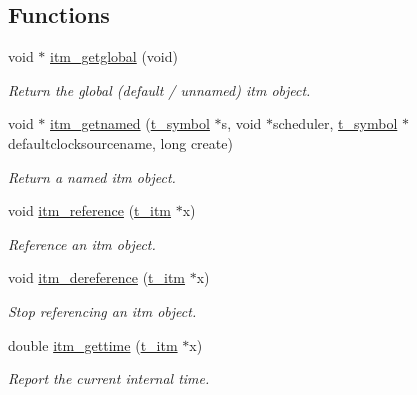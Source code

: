 \subsection*{Functions}
\begin{DoxyCompactItemize}
\item 
void $\ast$ \hyperlink{group__time_ga182b0bd45ff72d9ddccebd8cc9d552d1}{itm\_\-getglobal} (void)
\begin{DoxyCompactList}\small\item\em Return the global (default / unnamed) itm object. \item\end{DoxyCompactList}\item 
void $\ast$ \hyperlink{group__time_ga04a193f71ceaf7ce604e976a3affc99b}{itm\_\-getnamed} (\hyperlink{structt__symbol}{t\_\-symbol} $\ast$s, void $\ast$scheduler, \hyperlink{structt__symbol}{t\_\-symbol} $\ast$defaultclocksourcename, long create)
\begin{DoxyCompactList}\small\item\em Return a named itm object. \item\end{DoxyCompactList}\item 
void \hyperlink{group__time_ga33f7a4627e3d2a77748b66d2af7a0a1a}{itm\_\-reference} (\hyperlink{group__time_gac656fa1f920c69cf77e6631bcec53077}{t\_\-itm} $\ast$x)
\begin{DoxyCompactList}\small\item\em Reference an itm object. \item\end{DoxyCompactList}\item 
void \hyperlink{group__time_gae6d838ad8a0834e650a7664a50b0b6e2}{itm\_\-dereference} (\hyperlink{group__time_gac656fa1f920c69cf77e6631bcec53077}{t\_\-itm} $\ast$x)
\begin{DoxyCompactList}\small\item\em Stop referencing an itm object. \item\end{DoxyCompactList}\item 
double \hyperlink{group__time_ga6be6d66ebf8825d9edacec2f3e534dcb}{itm\_\-gettime} (\hyperlink{group__time_gac656fa1f920c69cf77e6631bcec53077}{t\_\-itm} $\ast$x)
\begin{DoxyCompactList}\small\item\em Report the current internal time. \item\end{DoxyCompactList}\item 

\end{DoxyCompactItemize}
